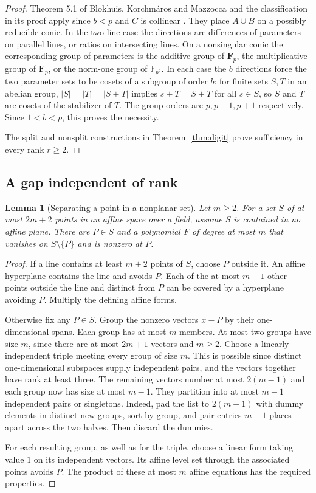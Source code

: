 \documentclass[11pt,letterpaper]{article}
\newcommand{\Fp}{\mathbf F_p}
\newtheorem{lemma}[theorem]{Lemma}
\theoremstyle{remark}
\begin{document}
\begin{proof}
Theorem 5.1 of Blokhuis, Korchm\'aros and Mazzocca and the classification
in its proof apply since $b<p$ and $C$ is collinear \cite{BKM}.  They
place $A\cup B$ on a possibly reducible conic.  In the two-line case
the directions are differences of parameters on parallel lines, or
ratios on intersecting lines.  On a nonsingular conic the corresponding
group of parameters is the additive group of $\Fp$, the multiplicative
group of $\Fp$, or the norm-one group of $\mathbb F_{p^2}$.  In each
case the $b$ directions force the two parameter sets to be cosets of
a subgroup of order $b$: for finite sets $S,T$ in an abelian group,
$|S|=|T|=|S+T|$ implies $s+T=S+T$ for all $s\in S$, so $S$ and $T$
are cosets of the stabilizer of $T$.  The group orders are
$p,p-1,p+1$ respectively.  Since $1<b<p$, this proves the necessity.

The split and nonsplit constructions in Theorem~\ref{thm:digit} prove
sufficiency in every rank $r\ge2$.
\end{proof}

\subsection{A gap independent of rank}

\begin{lemma}[Separating a point in a nonplanar set]\label{base:separator}
Let $m\ge2$. For a set $S$ of at most $2m+2$ points in an affine space
over a field, assume $S$ is contained in no affine plane.
There are $P\in S$ and a polynomial $F$ of degree at most $m$ that
vanishes on $S\setminus\{P\}$ and is nonzero at $P$.
\end{lemma}

\begin{proof}
If a line contains at least $m+2$ points of $S$, choose $P$ outside it.
An affine hyperplane contains the line and avoids $P$. Each of the at most
$m-1$ other points outside the line and distinct from $P$ can be covered by a
hyperplane avoiding $P$.  Multiply the defining affine forms.

Otherwise fix any $P\in S$.  Group the nonzero vectors $x-P$ by their
one-dimensional spans.  Each group has at most $m$ members.  At most
two groups have size $m$, since there are at most $2m+1$ vectors and
$m\ge2$.  Choose a linearly independent triple meeting every group of
size $m$. This is possible since distinct one-dimensional subspaces
supply independent pairs, and the vectors together have rank at least
three.  The remaining vectors number at most $2(m-1)$ and each group now
has size at most $m-1$.  They partition into at most $m-1$ independent
pairs or singletons. Indeed, pad the list to $2(m-1)$ with dummy elements
in distinct new groups, sort by group, and pair entries $m-1$ places apart
across the two halves. Then discard the dummies.

For each resulting group, as well as for the triple, choose a linear form
taking value $1$ on its independent vectors.  Its affine level set
through the associated points avoids $P$.  The product of these at most
$m$ affine equations has the required properties.
\end{proof}
\end{document}
